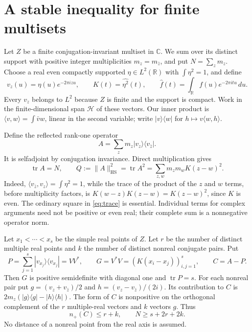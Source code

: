 ﻿\documentclass[11pt]{article}
\theoremstyle{remark}
\DeclareMathOperator{\tr}{tr}
\newcommand{\R}{\mathbb R}
\newcommand{\C}{\mathbb C}
\newcommand{\HS}{\mathrm{HS}}
\begin{document}
\section{A stable inequality for finite multisets}

Let $Z$ be a finite conjugation-invariant multiset in $\C$. We sum over its
distinct support with positive integer multiplicities $m_z=m_{\bar z}$,
and put $N=\sum_zm_z$. Choose a real even compactly supported
$\eta\in L^2(\R)$ with $\int\eta^2=1$, and define
\[
 v_z(u)=\eta(u)e^{-2\pi izu},\qquad
 K(t)=\widehat{\eta^2}(t),\qquad
 \widehat f(t)=\int_{\R}f(u)e^{-2\pi itu}\,du.
\]
Every $v_z$ belongs to $L^2$ because $Z$ is finite and the support is compact.
Work in the finite-dimensional span $\mathcal H$ of these vectors. Our inner product
is $\langle v,w\rangle=\int\bar v w$, linear in the second variable; write
$|v\rangle\langle w|$ for $h\mapsto v\langle w,h\rangle$.

Define the reflected rank-one operator
\begin{equation}\label{eq:operator}
 A=\sum_zm_z|v_z\rangle\langle v_{\bar z}|.
\end{equation}
It is selfadjoint by conjugation invariance. Direct multiplication gives
\begin{equation}\label{eq:trace}
 \tr A=N,\qquad
 Q:=\|A\|_{\HS}^2=\tr A^2
   =\sum_{z,w}m_zm_wK(z-w)^2.
\end{equation}
Indeed, $\langle v_{\bar z},v_z\rangle=\int\eta^2=1$, while the trace
of the product of the $z$ and $w$ terms, before multiplicity factors, is
$K(w-z)K(z-w)=K(z-w)^2$, since $K$ is even. The ordinary square in
\eqref{eq:trace} is essential. Individual terms for complex arguments need
not be positive or even real; their complete sum is a nonnegative operator
norm.

Let $x_1<\cdots<x_s$ be the simple real points of $Z$. Let $r$ be the
number of distinct multiple real points and $k$ the number of distinct
nonreal conjugate pairs. Put
\[
 P=\sum_{j=1}^s|v_{x_j}\rangle\langle v_{x_j}|=VV^*,\qquad
 G=V^*V=(K(x_i-x_j))_{i,j=1}^s,\qquad C=A-P.
\]
Then $G$ is positive semidefinite with diagonal one and $\tr P=s$.
For each nonreal pair put
$g=(v_z+v_{\bar z})/2$ and $h=(v_z-v_{\bar z})/(2i)$. Its contribution
to $C$ is $2m_z(|g\rangle\langle g|-|h\rangle\langle h|)$.
The form of $C$ is nonpositive on the orthogonal complement of the $r$
multiple-real vectors and $k$ vectors $g$. Thus
\begin{equation}\label{eq:inertia}
 n_+(C)\le r+k,\qquad N\ge s+2r+2k.
\end{equation}
No distance of a nonreal point from the real axis is assumed.
\end{document}
